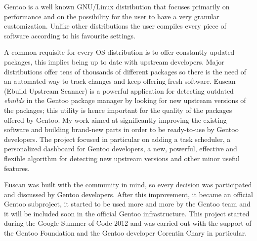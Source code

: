 
Gentoo is a well known GNU/Linux distribution that focuses primarily on performance and on the possibility for the user to have a very granular customization. Unlike other distributions the user compiles every piece of software according to his favourite settings.

A common requisite for every OS distribution is to offer constantly updated packages, this implies being up to date with upstream developers. Major distributions offer tens of thousands of different packages so there is the need of an automated way to track changes and keep offering fresh software.
Euscan (Ebuild Upstream Scanner) is a powerful application for detecting outdated \emph{ebuilds} in the Gentoo package manager by looking for new upstream versions of the packages; this utility is hence important for the quality of the packages offered by Gentoo.
My work aimed at significantly improving the existing software and building brand-new parts in order to be ready-to-use by Gentoo developers. The project focused in particular on adding a task scheduler, a personalized dashboard for Gentoo developers, a new, powerful, effective and flexible algorithm for detecting new upstream versions and other minor useful features.

Euscan was built with the community in mind, so every decision was participated and discussed by Gentoo developers. After this improvement, it became an official Gentoo subproject, it started to be used more and more by the Gentoo team and it will be included soon in the official Gentoo infrastructure.
This project started during the Google Summer of Code 2012 and was carried out with the support of the Gentoo Foundation and the Gentoo developer Corentin Chary in particular.
